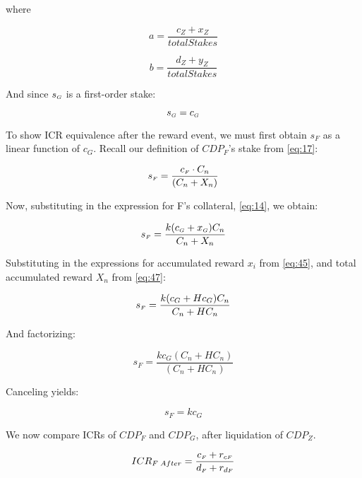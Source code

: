 \documentclass[reqno]{article}
\begin{document}
\bigskip
where

\begin{equation} 
    a=\frac{c_Z+x_Z}{totalStakes}
\end{equation}

\begin{equation} 
    b=\frac{d_Z+y_Z}{totalStakes}
\end{equation}

\bigskip
And since $s_\mathsmaller{G}$ is a first-order stake:

\begin{equation} \label{eq:21}
    s_\mathsmaller{G}=c_\mathsmaller{G}
\end{equation}

\bigskip
To show ICR equivalence after the reward event, we must first obtain $s_F$ as a linear function of $c_G$. Recall our definition of $CDP_F$’s stake from \ref{eq:17}:

\begin{equation} 
    s_\mathsmaller{F}=\frac{c_\mathsmaller{F} \cdot C_n}{(C_n+X_n)}
\end{equation}

\bigskip
Now, substituting in the expression for F’s collateral, \ref{eq:14}, we obtain:

\begin{equation} 
    s_\mathsmaller{F}=\frac{k(c_\mathsmaller{G}+x_\mathsmaller{G})C_n}{C_n+X_n}
\end{equation}


\bigskip
Substituting in the expressions for accumulated reward $x_i$ from \ref{eq:45}, and total accumulated reward $X_n$ from \ref{eq:47}:

\begin{equation} 
    s_\mathsmaller{F}=\frac{k(c_G+Hc_G)C_n}{C_n+HC_n}
\end{equation}

\bigskip
And factorizing:

\begin{equation} 
    s_F=\frac{kc_G(C_n+HC_n)}{(C_n+HC_n)}
\end{equation}

\bigskip
Canceling yields:

\begin{equation} \label{eq:29}
    s_F=kc_G
\end{equation}

\bigskip
We now compare ICRs of $CDP_F$ and $CDP_G$, after liquidation of $CDP_Z$.

\begin{equation} 
    ICR_{F \; After}=\frac{c_\mathsmaller{F}+r_{c\mathsmaller{F}}}{d_\mathsmaller{F}+r_{d\mathsmaller{F}}}
\end{equation}
\end{document}
